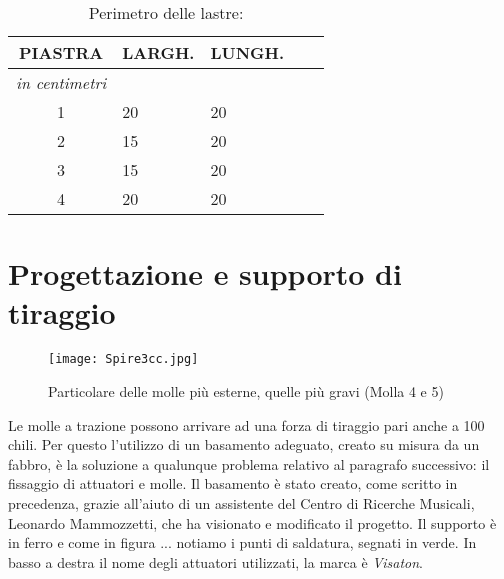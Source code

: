 \begin{table}[htp]
\caption{Perimetro delle lastre:}
\begin{center}

\begin{tabular}{cp{2cm}p{2cm}p{.2cm}p{2cm}} \textbf{PIASTRA}&\textbf{LARGH.}&\textbf{LUNGH.}\\
\hline \textit{in centimetri} \\
\hline 1&20&20\\
\hline 2&15&20\\
\hline 3&15&20\\
\hline 4&20&20\\
\end{tabular}

\end{center}
\label{default}
\end{table}%


\section{Progettazione e supporto di tiraggio}


\begin{figure}[htbp]
\begin{center}
\texttt{[image: Spire3cc.jpg]}
\caption{Particolare delle molle più esterne, quelle più gravi (Molla 4 e 5)}
\label{default}
\end{center}
\end{figure}

Le molle a trazione possono arrivare ad una forza di tiraggio pari anche a 100 chili. Per questo l'utilizzo di un basamento adeguato, creato su misura da un fabbro, è la soluzione a qualunque problema relativo al paragrafo successivo: il fissaggio di attuatori e molle.
Il basamento è stato creato, come scritto in precedenza, grazie all'aiuto di un assistente del Centro di Ricerche Musicali, Leonardo Mammozzetti, che ha visionato e modificato il progetto. Il supporto è in ferro e come in figura ... notiamo i punti di saldatura, segnati in verde. In basso a destra il nome degli attuatori utilizzati, la marca è \emph{Visaton}.

